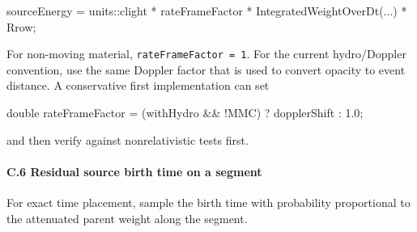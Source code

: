 \documentclass[
]{article}
\newenvironment{Shaded}{}{}
\newcommand{\DataTypeTok}[1]{\textcolor[rgb]{0.56,0.13,0.00}{#1}}
\newcommand{\FloatTok}[1]{\textcolor[rgb]{0.25,0.63,0.44}{#1}}
\newcommand{\NormalTok}[1]{#1}
\newcommand{\OperatorTok}[1]{\textcolor[rgb]{0.40,0.40,0.40}{#1}}
\begin{document}
\begin{Shaded}
\begin{Highlighting}[]
\NormalTok{sourceEnergy }\OperatorTok{=}\NormalTok{ units}\OperatorTok{::}\NormalTok{clight }\OperatorTok{*}\NormalTok{ rateFrameFactor }\OperatorTok{*}\NormalTok{ IntegratedWeightOverDt}\OperatorTok{(...)} \OperatorTok{*}\NormalTok{ Rrow}\OperatorTok{;}
\end{Highlighting}
\end{Shaded}

For non-moving material, \texttt{rateFrameFactor\ =\ 1}. For the current
hydro/Doppler convention, use the same Doppler factor that is used to
convert opacity to event distance. A conservative first implementation
can set

\begin{Shaded}
\begin{Highlighting}[]
\DataTypeTok{double}\NormalTok{ rateFrameFactor }\OperatorTok{=} \OperatorTok{(}\NormalTok{withHydro }\OperatorTok{\&\&} \OperatorTok{!}\NormalTok{MMC}\OperatorTok{)} \OperatorTok{?}\NormalTok{ dopplerShift }\OperatorTok{:} \FloatTok{1.0}\OperatorTok{;}
\end{Highlighting}
\end{Shaded}

and then verify against nonrelativistic tests first.

\paragraph{C.6 Residual source birth time on a
segment}\label{c.6-residual-source-birth-time-on-a-segment}

For exact time placement, sample the birth time with probability
proportional to the attenuated parent weight along the segment.
\end{document}
